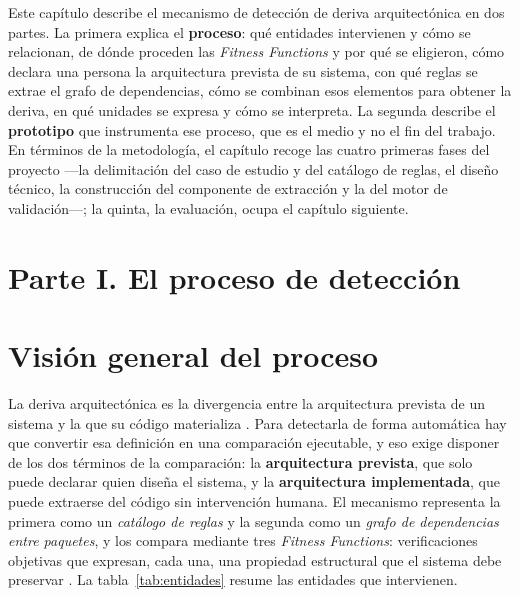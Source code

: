 
Este capítulo describe el mecanismo de detección de deriva arquitectónica en dos partes. La primera explica el \textbf{proceso}: qué entidades intervienen y cómo se relacionan, de dónde proceden las \textit{Fitness Functions} y por qué se eligieron, cómo declara una persona la arquitectura prevista de su sistema, con qué reglas se extrae el grafo de dependencias, cómo se combinan esos elementos para obtener la deriva, en qué unidades se expresa y cómo se interpreta. La segunda describe el \textbf{prototipo} que instrumenta ese proceso, que es el medio y no el fin del trabajo. En términos de la metodología, el capítulo recoge las cuatro primeras fases del proyecto ---la delimitación del caso de estudio y del catálogo de reglas, el diseño técnico, la construcción del componente de extracción y la del motor de validación---; la quinta, la evaluación, ocupa el capítulo siguiente.

\section*{Parte I. El proceso de detección}

\section{Visión general del proceso}
\label{sec:proceso}
La deriva arquitectónica es la divergencia entre la arquitectura prevista de un sistema y la que su código materializa \citep{PerryWolf1992, SanMartin}. Para detectarla de forma automática hay que convertir esa definición en una comparación ejecutable, y eso exige disponer de los dos términos de la comparación: la \textbf{arquitectura prevista}, que solo puede declarar quien diseña el sistema, y la \textbf{arquitectura implementada}, que puede extraerse del código sin intervención humana. El mecanismo representa la primera como un \textit{catálogo de reglas} y la segunda como un \textit{grafo de dependencias entre paquetes}, y los compara mediante tres \textit{Fitness Functions}: verificaciones objetivas que expresan, cada una, una propiedad estructural que el sistema debe preservar \citep{FordParsonsKua2017}. La tabla~\ref{tab:entidades} resume las entidades que intervienen.

